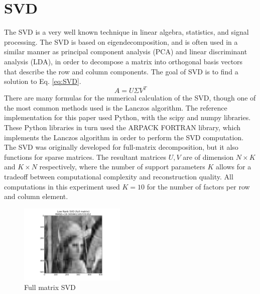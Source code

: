\documentclass[journal]{IEEEtran}
\begin{document}
\section{SVD}
The SVD is a very well known technique in linear algebra, statistics, and signal processing. The SVD is based on eigendecomposition, and is often used 
in a similar manner as principal component analysis (PCA) and linear discriminant analysis (LDA), in order to decompose a matrix into 
orthogonal basis vectors that describe the row and column components. The goal of SVD is to find a solution to Eq. \ref{eq:SVD}.
\begin{equation}
    A=U \Sigma V^T
\label{eq:SVD}
\end{equation}
There are many formulas for the numerical calculation of the SVD, though one of the most common methods used is the Lanczos
algorithm. The reference implementation for this paper used Python, with the scipy and numpy libraries. These Python libraries in turn used 
the ARPACK FORTRAN library, which implements the Lanczos algorithm in order to perform the SVD computation. The SVD was originally
developed for full-matrix decomposition, but it also functions for sparse matrices. The resultant matrices \begin{math}U,V\end{math} are of
dimension \begin{math}N \times K\end{math} and \begin{math}K \times N\end{math} respectively, where the number of support parameters
\begin{math}K\end{math} allows for a tradeoff between computational complexity and reconstruction quality. All computations in this experiment used
\begin{math}K=10\end{math} for the number of factors per row and column element. 
\begin{figure}[h!]
\centering
    \includegraphics[width=0.45\textwidth]{fullsvd.png}
    \caption{Full matrix SVD}
    \label{fig:fullSVD}
\end{figure}
\end{document}
